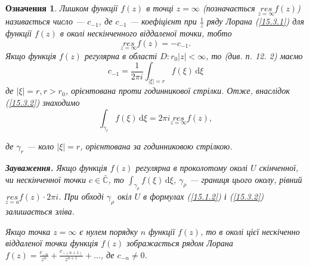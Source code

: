 \documentclass[12pt,fleqn]{article}
\theoremstyle{theorem}
\newtheorem{ozn}{Означення}[section]
\theoremstyle{proof}
\numberwithin{figure}{section}
\numberwithin{equation}{section}
\begin{document}
\begin{ozn}
  Лишком функції $f(z)$ в точці $z=\infty$ (позначається $\underset{z=\infty}{res}f(z)$) називається число --- $c_{-1}$, де $c_{-1}$ --- коефіцієнт при $\frac{1}{z}$ ряду Лорана (\ref{15.3.1}) для функції $f(z)$ в околі нескінченного віддаленої точки, тобто
\begin{equation}\label{15.3.2}
      \underset{z=\infty}{res}f(z)=-c_{-1}.
\end{equation}
Якщо функція $f(z)$ регулярна в області $D:r_0|z|<\infty$, то (див. п. 12. 2) маємо
\[c_{-1}=\frac{1}{2\pi i}\int_{|\xi|=r}f(\xi)\,\mathrm{d}\xi\]
де $|\xi|=r, r>r_0$, орієнтована проти годинникової стрілки. Отже, внаслідок (\ref{15.3.2}) знаходимо
\begin{equation}\label{15.3.2}
     \int_{\gamma_r}f(\xi)\,\mathrm{d}\xi=2\pi i  \underset{z=\infty}{res} f(z),
\end{equation}
 
де $\gamma_r$ --- коло $|\xi|=r$, орієнтована за годинниковою стрілкою.

\textbf{Зауваження.} Якщо функція $f(z)$ регулярна в проколотому околі $U$ скінченної, чи нескінченної точки $c\in \bar{\mathbb{C}}$, то $\int_{\gamma_\rho}f(\xi)\,\mathrm{d}\xi$, $\gamma_\rho$ --- границя цього околу, рівний $\underset{z=a}{res}f(z)\cdot 2\pi i$. При обході $\gamma_\rho$ окіл $U$ в формулах (\ref{15.1.2}) і (\ref{15.3.2}) залишається зліва.

Якщо точка $z=\infty$ є нулем порядку $n$ функції $f(z)$, то в околі цієї нескіченно віддаленої точки функція $f(z)$ зображається рядом Лорана $f(z) = \frac{c_{-n}}{z^n}+\frac{c_{-(n+1)}}{z^{n+1}}+\dots$, де $c_{-n}\neq 0$.
\end{ozn}
\end{document}

